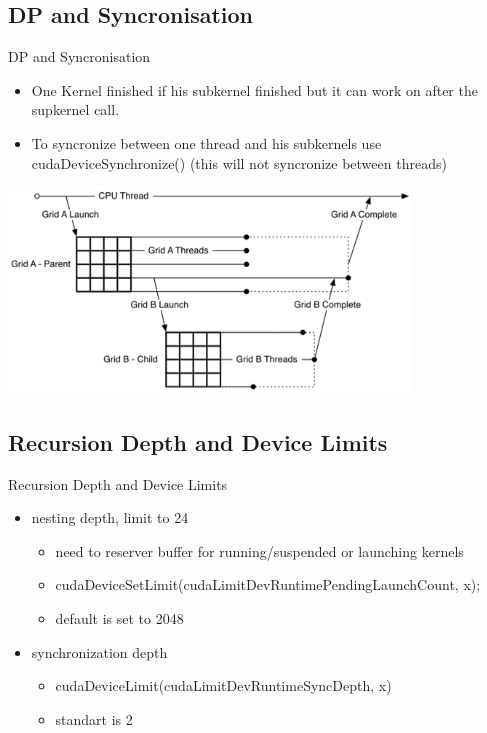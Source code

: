 \documentclass[fleqn,11pt,aspectratio=43]{beamer}
\begin{document}
\subsection{DP and Syncronisation}
\begin{frame}{DP and Syncronisation}
	\begin{itemize}
		\item One Kernel finished if his subkernel finished but it can work on after the supkernel call.
		\item To syncronize between one thread and his subkernels use cudaDeviceSynchronize() (this will not syncronize between threads)
	\end{itemize}
	\centering
	\includegraphics[width=0.8\textwidth]{nesting-of-grids.png}
\end{frame}


\subsection{Recursion Depth and Device Limits}
\begin{frame}[fragile]{Recursion Depth and Device Limits}
	\begin{itemize}
		\item nesting depth, limit to 24
			\begin{itemize}
				\item need to reserver buffer for running/suspended or launching kernels
				\item cudaDeviceSetLimit(cudaLimitDevRuntimePendingLaunchCount, x);
				\item default is set to 2048
			\end{itemize}
		\item synchronization depth
			\begin{itemize}
				\item cudaDeviceLimit(cudaLimitDevRuntimeSyncDepth, x)
				\item standart is 2
			\end{itemize}
	\end{itemize}
\end{frame}
\end{document}
